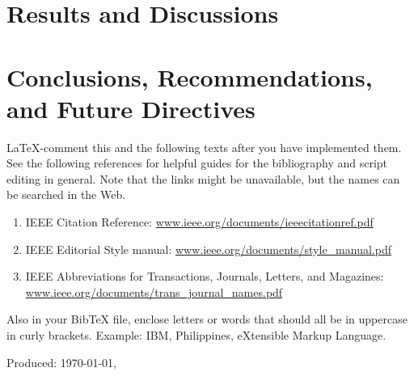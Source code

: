 	\ifResultDiscuss 
	\chapter{Results and Discussions} 
		
	\cleardoublepage
	\fi
	
	\ifConc
	\chapter{Conclusions, Recommendations, and Future Directives} 
	\label{ch:conc} 
		
	\cleardoublepage
	\fi
	
	\renewcommand{\UrlFont}{\normalfont}
	\begin{SingleSpace}
		{\small }
		\vfill
		\LaTeX-comment this and the following texts after you have implemented them. See the following references for helpful guides for the bibliography and script editing in general.  Note that the links might be unavailable, but the names can be searched in the Web.
		
		\begin{enumerate}
			\item IEEE Citation Reference: \url{www.ieee.org/documents/ieeecitationref.pdf}
			
			\item IEEE Editorial Style manual: \url{www.ieee.org/documents/style_manual.pdf} 
			
			\item IEEE Abbreviations for Transactions, Journals, Letters, and Magazines: \url{www.ieee.org/documents/trans_journal_names.pdf}
		\end{enumerate}
		
		\noindent Also in your BibTeX file, enclose letters or words that should all be in uppercase in curly brackets. Example: {IBM}, {P}hilippines, e{X}tensible {M}arkup {L}anguage.
		
	\end{SingleSpace}
	\vfill
	\begin{flushright}
		Produced: \usdate\today, \currenttime \\
	\end{flushright}
	\cleardoublepage 
	
